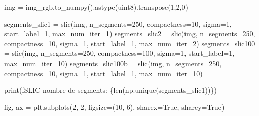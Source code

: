 \documentclass[
  11pt,
  letterpaper,
  open=any,
  twoside=false,
  french]{scrbook}
\newenvironment{Shaded}{\begin{snugshade}}{\end{snugshade}}
\newcommand{\BuiltInTok}[1]{\textcolor[rgb]{0.00,0.23,0.31}{#1}}
\newcommand{\DecValTok}[1]{\textcolor[rgb]{0.68,0.00,0.00}{#1}}
\newcommand{\NormalTok}[1]{\textcolor[rgb]{0.00,0.23,0.31}{#1}}
\newcommand{\OperatorTok}[1]{\textcolor[rgb]{0.37,0.37,0.37}{#1}}
\newcommand{\SpecialCharTok}[1]{\textcolor[rgb]{0.37,0.37,0.37}{#1}}
\newcommand{\SpecialStringTok}[1]{\textcolor[rgb]{0.13,0.47,0.30}{#1}}
\newcommand{\StringTok}[1]{\textcolor[rgb]{0.13,0.47,0.30}{#1}}
\newcommand{\VariableTok}[1]{\textcolor[rgb]{0.07,0.07,0.07}{#1}}
\begin{document}
\begin{Shaded}
\begin{Highlighting}[]
\NormalTok{img }\OperatorTok{=}\NormalTok{ img\_rgb.to\_numpy().astype(}\StringTok{\textquotesingle{}uint8\textquotesingle{}}\NormalTok{).transpose(}\DecValTok{1}\NormalTok{,}\DecValTok{2}\NormalTok{,}\DecValTok{0}\NormalTok{) }

\NormalTok{segments\_slic1 }\OperatorTok{=}\NormalTok{ slic(img, n\_segments}\OperatorTok{=}\DecValTok{250}\NormalTok{, compactness}\OperatorTok{=}\DecValTok{10}\NormalTok{, sigma}\OperatorTok{=}\DecValTok{1}\NormalTok{, start\_label}\OperatorTok{=}\DecValTok{1}\NormalTok{, max\_num\_iter}\OperatorTok{=}\DecValTok{1}\NormalTok{)}
\NormalTok{segments\_slic2 }\OperatorTok{=}\NormalTok{ slic(img, n\_segments}\OperatorTok{=}\DecValTok{250}\NormalTok{, compactness}\OperatorTok{=}\DecValTok{10}\NormalTok{, sigma}\OperatorTok{=}\DecValTok{1}\NormalTok{, start\_label}\OperatorTok{=}\DecValTok{1}\NormalTok{, max\_num\_iter}\OperatorTok{=}\DecValTok{2}\NormalTok{)}
\NormalTok{segments\_slic100 }\OperatorTok{=}\NormalTok{ slic(img, n\_segments}\OperatorTok{=}\DecValTok{250}\NormalTok{, compactness}\OperatorTok{=}\DecValTok{100}\NormalTok{, sigma}\OperatorTok{=}\DecValTok{1}\NormalTok{, start\_label}\OperatorTok{=}\DecValTok{1}\NormalTok{, max\_num\_iter}\OperatorTok{=}\DecValTok{10}\NormalTok{)}
\NormalTok{segments\_slic100b }\OperatorTok{=}\NormalTok{ slic(img, n\_segments}\OperatorTok{=}\DecValTok{250}\NormalTok{, compactness}\OperatorTok{=}\DecValTok{10}\NormalTok{, sigma}\OperatorTok{=}\DecValTok{1}\NormalTok{, start\_label}\OperatorTok{=}\DecValTok{1}\NormalTok{, max\_num\_iter}\OperatorTok{=}\DecValTok{10}\NormalTok{)}

\BuiltInTok{print}\NormalTok{(}\SpecialStringTok{f\textquotesingle{}SLIC nombre de segments: }\SpecialCharTok{\{}\BuiltInTok{len}\NormalTok{(np.unique(segments\_slic1))}\SpecialCharTok{\}}\SpecialStringTok{\textquotesingle{}}\NormalTok{)}

\NormalTok{fig, ax }\OperatorTok{=}\NormalTok{ plt.subplots(}\DecValTok{2}\NormalTok{, }\DecValTok{2}\NormalTok{, figsize}\OperatorTok{=}\NormalTok{(}\DecValTok{10}\NormalTok{, }\DecValTok{6}\NormalTok{), sharex}\OperatorTok{=}\VariableTok{True}\NormalTok{, sharey}\OperatorTok{=}\VariableTok{True}\NormalTok{)}


\end{Highlighting}
\end{Shaded}
\end{document}

